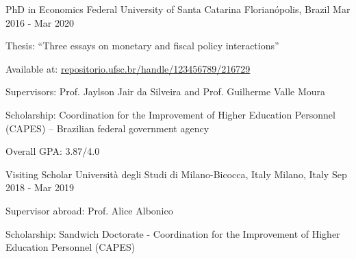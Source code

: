 

\begin{cventries}

  \cventry
    {PhD in Economics} %
    {Federal University of Santa Catarina} %
    {Florianópolis, Brazil} %
    {Mar 2016 - Mar 2020} %
    {
      \begin{cvitems} %
        \item {Thesis: ``Three essays on monetary and fiscal policy interactions''}
        \item {Available at: \href{https://repositorio.ufsc.br/handle/123456789/216729}{repositorio.ufsc.br/handle/123456789/216729}}
        \item {Supervisors: Prof. Jaylson Jair da Silveira and Prof. Guilherme Valle Moura}
        \item {Scholarship: Coordination for the Improvement of Higher Education Personnel (CAPES) -- Brazilian federal government agency}
        \item {Overall GPA: 3.87/4.0}
      \end{cvitems}
    }
    
  \cventry
    {Visiting Scholar} %
    {Università degli Studi di Milano-Bicocca, Italy} %
    {Milano, Italy} %
    {Sep 2018 - Mar 2019} %
    {
      \begin{cvitems} %
        \item {Supervisor abroad: Prof. Alice Albonico}
        \item {Scholarship: Sandwich Doctorate - Coordination for the Improvement of Higher Education Personnel (CAPES)} 
      \end{cvitems}
    }
    

\end{cventries}
